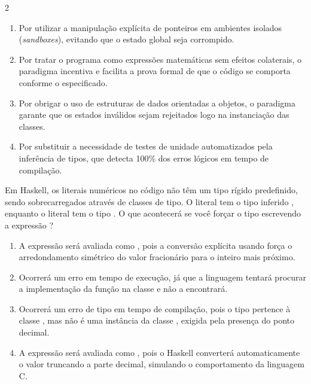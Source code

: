\documentclass[a4paper,10pt,brazil]{article}
\begin{document}
\begin{multicols}{2}
\begin{enumerate}
  \item Por utilizar a manipulação explícita de ponteiros em ambientes isolados (\emph{sandboxes}), evitando que o estado global seja corrompido.

  \item Por tratar o programa como expressões matemáticas sem efeitos colaterais, o paradigma incentiva e facilita a prova formal de que o código se comporta conforme o especificado.

  \item Por obrigar o uso de estruturas de dados orientadas a objetos, o paradigma garante que os estados inválidos sejam rejeitados logo na instanciação das classes.

  \item Por substituir a necessidade de testes de unidade automatizados pela inferência de tipos, que detecta 100\% dos erros lógicos em tempo de compilação.


\end{enumerate}

Em Haskell, os literais numéricos no código não têm um tipo rígido predefinido, sendo sobrecarregados através de classes de tipo. O literal  tem o tipo inferido , enquanto o literal  tem o tipo . 
O que acontecerá se você forçar o tipo escrevendo a expressão ?

\begin{enumerate}
  \item A expressão será avaliada como , pois a conversão explícita usando \haskellinline{::} força o arredondamento simétrico do valor fracionário para o inteiro mais próximo.

  \item Ocorrerá um erro em tempo de execução, já que a linguagem tentará procurar a implementação da função  na classe  e não a encontrará.

  \item Ocorrerá um erro de tipo em tempo de compilação, pois o tipo  pertence à classe , mas não é uma instância da classe , exigida pela presença do ponto decimal.

  \item A expressão será avaliada como , pois o Haskell converterá automaticamente o valor truncando a parte decimal, simulando o comportamento da linguagem C.


\end{enumerate}
\end{multicols}
\end{document}
